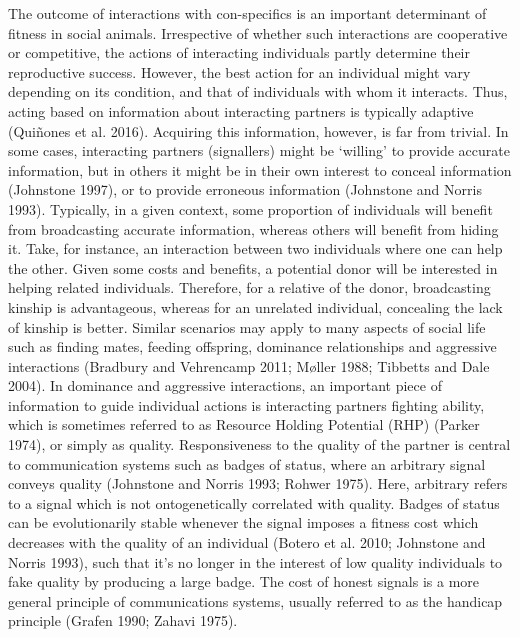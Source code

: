 \documentclass[
  12pt,
]{article}
\begin{document}
The outcome of interactions with con-specifics is an important
determinant of fitness in social animals. Irrespective of whether such
interactions are cooperative or competitive, the actions of interacting
individuals partly determine their reproductive success. However, the
best action for an individual might vary depending on its condition, and
that of individuals with whom it interacts. Thus, acting based on
information about interacting partners is typically adaptive (Quiñones
et al. 2016). Acquiring this information, however, is far from trivial.
In some cases, interacting partners (signallers) might be `willing' to
provide accurate information, but in others it might be in their own
interest to conceal information (Johnstone 1997), or to provide
erroneous information (Johnstone and Norris 1993). Typically, in a given
context, some proportion of individuals will benefit from broadcasting
accurate information, whereas others will benefit from hiding it. Take,
for instance, an interaction between two individuals where one can help
the other. Given some costs and benefits, a potential donor will be
interested in helping related individuals. Therefore, for a relative of
the donor, broadcasting kinship is advantageous, whereas for an
unrelated individual, concealing the lack of kinship is better. Similar
scenarios may apply to many aspects of social life such as finding
mates, feeding offspring, dominance relationships and aggressive
interactions (Bradbury and Vehrencamp 2011; Møller 1988; Tibbetts and
Dale 2004). In dominance and aggressive interactions, an important piece
of information to guide individual actions is interacting partners
fighting ability, which is sometimes referred to as Resource Holding
Potential (RHP) (Parker 1974), or simply as quality. Responsiveness to
the quality of the partner is central to communication systems such as
badges of status, where an arbitrary signal conveys quality (Johnstone
and Norris 1993; Rohwer 1975). Here, arbitrary refers to a signal which
is not ontogenetically correlated with quality. Badges of status can be
evolutionarily stable whenever the signal imposes a fitness cost which
decreases with the quality of an individual (Botero et al. 2010;
Johnstone and Norris 1993), such that it's no longer in the interest of
low quality individuals to fake quality by producing a large badge. The
cost of honest signals is a more general principle of communications
systems, usually referred to as the handicap principle (Grafen 1990;
Zahavi 1975).
\end{document}
